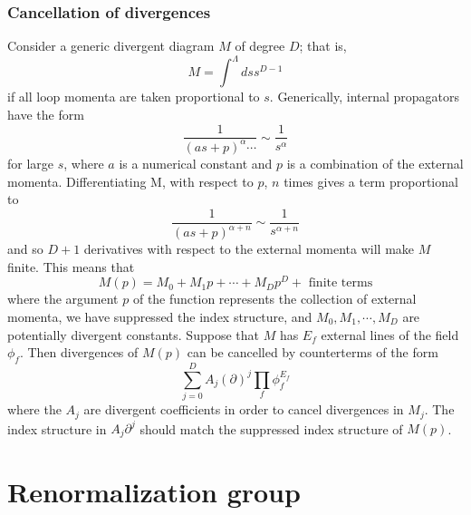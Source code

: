 \documentclass[cyan]{elegantnote}
\begin{document}
\subsubsection{Cancellation of divergences}
Consider a generic divergent diagram $M$ of degree $D$; that is,
\[M = \int^{\Lambda} ds s^{D-1}\]
if all loop momenta are taken proportional to $s$. Generically, internal propagators have the form
\[\frac{1}{(as+p)^{\alpha}\cdots} \sim \frac{1}{s^{\alpha}}\]
for large $s$, where $a$ is a numerical constant and $p$ is a combination of the external momenta. Differentiating M,
with respect to $p$, $n$ times gives a term proportional to
\[\frac{1}{(as+p)^{\alpha+n}} \sim \frac{1}{s^{\alpha + n}} \]
and so $D+1$ derivatives with respect to the external momenta will make $M$ finite. This means that
\[M(p) = M_0 + M_1 p + \cdots + M_D p^D + \mbox{ finite terms}\]
where the argument $p$ of the function represents the collection of external momenta, we have suppressed the index structure, and $M_0,M_1,\cdots,M_D$ are potentially divergent constants. Suppose that $M$ has $E_f$ external lines of the field $\phi_f$. Then divergences of $M(p)$ can be cancelled by counterterms of the form
\[\sum_{j=0}^D A_j (\partial)^j \prod_f \phi_f^{E_f}\]
where the $A_j$ are divergent coefficients in order to cancel divergences in $M_j$. The index structure in $A_j \partial^j$ should
match the suppressed index structure of $M(p)$.

\section{Renormalization group}
\end{document}

